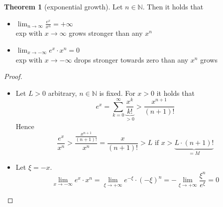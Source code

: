 \documentclass[a4paper,landscape,twocolumn]{article}
\theoremstyle{definition}
\newtheorem{theorem}{Theorem}
\begin{document}
\begin{theorem}[exponential growth]
  Let $n \in \mathbb N$. Then it holds that
  \begin{itemize}
    \item $\lim_{n\to\infty} \frac{e^x}{x^n} = +\infty$ \\
      exp with $x \to \infty$ grows stronger than any $x^n$
    \item $\lim_{x\to-\infty} e^x \cdot x^n = 0$ \\
      exp with $x \to -\infty$ drops stronger towards zero than any $x^n$ grows
  \end{itemize}
\end{theorem}
\begin{proof}
  \begin{itemize}
    \item
      Let $L > 0$ arbitrary, $n \in \mathbb N$ is fixed.
      For $x > 0$ it holds that
      \[ e^x = \sum_{k=0}^\infty \underbrace{\frac{x^k}{k!}}_{>0} > \frac{x^{n+1}}{(n+1)!} \]
      Hence
      \[ \frac{e^x}{x^n} > \frac{\frac{x^{n+1}}{(n+1)!}}{x^n} = \frac{x}{(n+1)!} > L \text{ if } x > \underbrace{L \cdot (n+1)!}_{=M} \]
    \item
      Let $\xi = -x$.
      \[
        \lim_{x \to -\infty} e^x \cdot x^n
        = \lim_{\xi \to +\infty} e^{-\xi} \cdot (-\xi)^n
        = - \lim_{\xi \to +\infty} \frac{\xi^n}{e^\xi}
        = 0
      \]
  \end{itemize}
\end{proof}

\clearpage
\begin{otherlanguage}{ngerman}
\printindex[German]
\end{otherlanguage}
\printindex[English]
\end{document}
